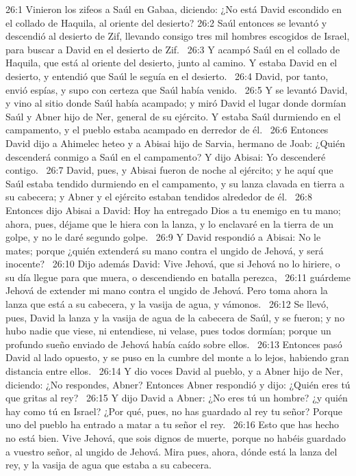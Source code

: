 26:1 Vinieron los zifeos a Saúl en Gabaa, diciendo: ¿No está David escondido en el collado de Haquila, al oriente del desierto? 
26:2 Saúl entonces se levantó y descendió al desierto de Zif, llevando consigo tres mil hombres escogidos de Israel, para buscar a David en el desierto de Zif.  
26:3 Y acampó Saúl en el collado de Haquila, que está al oriente del desierto, junto al camino. Y estaba David en el desierto, y entendió que Saúl le seguía en el desierto.  
26:4 David, por tanto, envió espías, y supo con certeza que Saúl había venido.  
26:5 Y se levantó David, y vino al sitio donde Saúl había acampado; y miró David el lugar donde dormían Saúl y Abner hijo de Ner, general de su ejército. Y estaba Saúl durmiendo en el campamento, y el pueblo estaba acampado en derredor de él.  
26:6 Entonces David dijo a Ahimelec heteo y a Abisai hijo de Sarvia, hermano de Joab: ¿Quién descenderá conmigo a Saúl en el campamento? Y dijo Abisai: Yo descenderé contigo.  
26:7 David, pues, y Abisai fueron de noche al ejército; y he aquí que Saúl estaba tendido durmiendo en el campamento, y su lanza clavada en tierra a su cabecera; y Abner y el ejército estaban tendidos alrededor de él.  
26:8 Entonces dijo Abisai a David: Hoy ha entregado Dios a tu enemigo en tu mano; ahora, pues, déjame que le hiera con la lanza, y lo enclavaré en la tierra de un golpe, y no le daré segundo golpe.  
26:9 Y David respondió a Abisai: No le mates; porque ¿quién extenderá su mano contra el ungido de Jehová, y será inocente?  
26:10 Dijo además David: Vive Jehová, que si Jehová no lo hiriere, o su día llegue para que muera, o descendiendo en batalla perezca,  
26:11 guárdeme Jehová de extender mi mano contra el ungido de Jehová. Pero toma ahora la lanza que está a su cabecera, y la vasija de agua, y vámonos.  
26:12 Se llevó, pues, David la lanza y la vasija de agua de la cabecera de Saúl, y se fueron; y no hubo nadie que viese, ni entendiese, ni velase, pues todos dormían; porque un profundo sueño enviado de Jehová había caído sobre ellos.  
26:13 Entonces pasó David al lado opuesto, y se puso en la cumbre del monte a lo lejos, habiendo gran distancia entre ellos.  
26:14 Y dio voces David al pueblo, y a Abner hijo de Ner, diciendo: ¿No respondes, Abner? Entonces Abner respondió y dijo: ¿Quién eres tú que gritas al rey?  
26:15 Y dijo David a Abner: ¿No eres tú un hombre? ¿y quién hay como tú en Israel? ¿Por qué, pues, no has guardado al rey tu señor? Porque uno del pueblo ha entrado a matar a tu señor el rey.  
26:16 Esto que has hecho no está bien. Vive Jehová, que sois dignos de muerte, porque no habéis guardado a vuestro señor, al ungido de Jehová. Mira pues, ahora, dónde está la lanza del rey, y la vasija de agua que estaba a su cabecera.  
